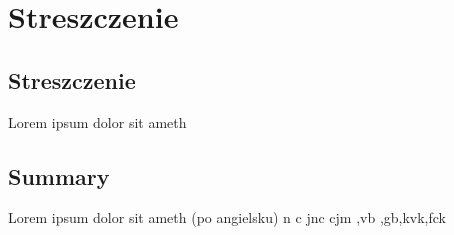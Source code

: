 \chapter{Streszczenie}
\label{cha:streszczenie}

\section{Streszczenie}
\label{sec:streszczenie}

Lorem ipsum dolor sit ameth


\section{Summary}
\label{sec:summary}

Lorem ipsum dolor sit ameth (po angielsku)
n c  jnc cjm ,vb ,gb,kvk,fck


